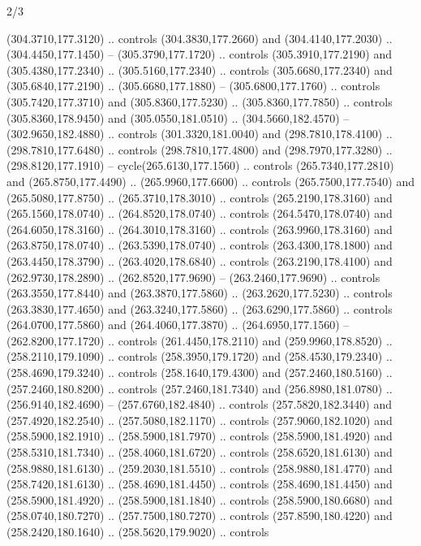 \begin{flagdescription}{2/3}
\begin{scope}[xshift=0.5\flaglength,yshift=0.5\flagwidth,scale=\flagwidth/259.2]
\begin{scope}[y=0.8pt, x=0.8pt, yscale=-1,shift={(-243,-162)}]
      (304.3710,177.3120) .. controls (304.3830,177.2660) and (304.4140,177.2030) ..
      (304.4450,177.1450) -- (305.3790,177.1720) .. controls (305.3910,177.2190) and
      (305.4380,177.2340) .. (305.5160,177.2340) .. controls (305.6680,177.2340) and
      (305.6840,177.2190) .. (305.6680,177.1880) -- (305.6800,177.1760) .. controls
      (305.7420,177.3710) and (305.8360,177.5230) .. (305.8360,177.7850) .. controls
      (305.8360,178.9450) and (305.0550,181.0510) .. (304.5660,182.4570) --
      (302.9650,182.4880) .. controls (301.3320,181.0040) and (298.7810,178.4100) ..
      (298.7810,177.6480) .. controls (298.7810,177.4800) and (298.7970,177.3280) ..
      (298.8120,177.1910) -- cycle(265.6130,177.1560) .. controls
      (265.7340,177.2810) and (265.8750,177.4490) .. (265.9960,177.6600) .. controls
      (265.7500,177.7540) and (265.5080,177.8750) .. (265.3710,178.3010) .. controls
      (265.2190,178.3160) and (265.1560,178.0740) .. (264.8520,178.0740) .. controls
      (264.5470,178.0740) and (264.6050,178.3160) .. (264.3010,178.3160) .. controls
      (263.9960,178.3160) and (263.8750,178.0740) .. (263.5390,178.0740) .. controls
      (263.4300,178.1800) and (263.4450,178.3790) .. (263.4020,178.6840) .. controls
      (263.2190,178.4100) and (262.9730,178.2890) .. (262.8520,177.9690) --
      (263.2460,177.9690) .. controls (263.3550,177.8440) and (263.3870,177.5860) ..
      (263.2620,177.5230) .. controls (263.3830,177.4650) and (263.3240,177.5860) ..
      (263.6290,177.5860) .. controls (264.0700,177.5860) and (264.4060,177.3870) ..
      (264.6950,177.1560) -- (262.8200,177.1720) .. controls (261.4450,178.2110) and
      (259.9960,178.8520) .. (258.2110,179.1090) .. controls (258.3950,179.1720) and
      (258.4530,179.2340) .. (258.4690,179.3240) .. controls (258.1640,179.4300) and
      (257.2460,180.5160) .. (257.2460,180.8200) .. controls (257.2460,181.7340) and
      (256.8980,181.0780) .. (256.9140,182.4690) -- (257.6760,182.4840) .. controls
      (257.5820,182.3440) and (257.4920,182.2540) .. (257.5080,182.1170) .. controls
      (257.9060,182.1020) and (258.5900,182.1910) .. (258.5900,181.7970) .. controls
      (258.5900,181.4920) and (258.5310,181.7340) .. (258.4060,181.6720) .. controls
      (258.6520,181.6130) and (258.9880,181.6130) .. (259.2030,181.5510) .. controls
      (258.9880,181.4770) and (258.7420,181.6130) .. (258.4690,181.4450) .. controls
      (258.4690,181.4450) and (258.5900,181.4920) .. (258.5900,181.1840) .. controls
      (258.5900,180.6680) and (258.0740,180.7270) .. (257.7500,180.7270) .. controls
      (257.8590,180.4220) and (258.2420,180.1640) .. (258.5620,179.9020) .. controls

\end{scope}
\end{scope}
\end{flagdescription}
